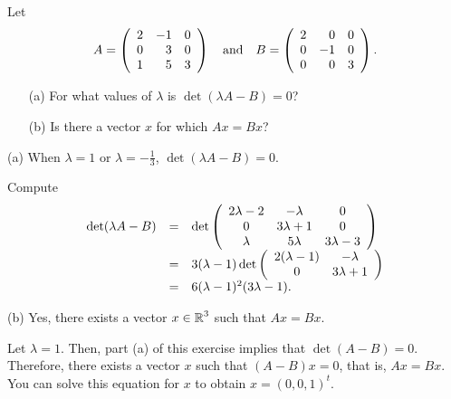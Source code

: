 \documentclass{ximera}
\begin{document}
\begin{exercise} \label{c10.1.6}
Let 
\[
A = \left(\begin{array}{rrr} 2 & -1 & 0 \\ 0 & 3 & 0 \\ 1 & 5 & 3
\end{array} \right)  \quad\mbox{and}\quad
B = \left(\begin{array}{rrr} 2 & 0 & 0 \\ 0 & -1 & 0 \\ 0 & 0 & 3
\end{array} \right).
\]
\begin{itemize}
\item[(a)] For what values of $\lambda$ is  $\det(\lambda A-B)=0$?
\item[(b)] Is there a vector $x$ for which $Ax=Bx$?
\end{itemize}

\begin{solution}

(a) \ans When $\lambda = 1$ or $\lambda = -\frac{1}{3}$,
$\det(\lambda A - B) = 0$.

\soln Compute
\[
\begin{array}{rcl}
\det(\lambda A - B) & = & \det\left(\begin{array}{ccc} 2\lambda - 2 & -\lambda & 0 \\ 0 & 3\lambda + 1 & 0 \\ \lambda & 5\lambda & 3\lambda - 3\end{array}\right) \\
& = & 3(\lambda - 1)\det\left(\begin{array}{cc} 2(\lambda - 1) & -\lambda\\ 0 &3\lambda + 1\end{array}\right) \\
& = & 6(\lambda - 1)^2(3\lambda - 1).
\end{array}
\]

(b) \ans Yes, there exists a vector $x \in \mbox{$\Bbb{R}$}^3$ such that $Ax = Bx$.

\soln Let $\lambda = 1$.  Then, part (a) of this exercise implies that
$\det(A - B) = 0$.  Therefore, there exists a vector $x$ such that
$(A - B)x = 0$, that is, $Ax = Bx$.  You can solve this equation for $x$
to obtain $x = (0,0,1)^t$.

\end{solution}
\end{exercise}
\end{document}
